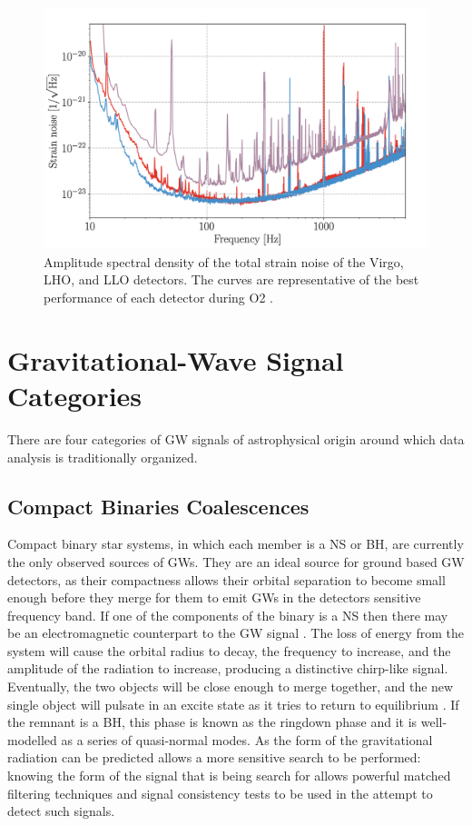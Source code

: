 \documentclass[binding=0.6cm, LaM]{sapthesis}
\begin{document}
        \begin{figure}[t]
          \includegraphics[scale=0.6]{noise1}
          \centering
          \caption{Amplitude spectral density of the total strain noise  of the Virgo, LHO, and LLO detectors. The curves are representative of the best performance of each detector during O2 \cite{13}.}
          \label{fig:noise1}
        \end{figure}

\section{Gravitational-Wave Signal Categories}
\label{sec:sources}
	There are four categories of GW signals of astrophysical origin around which data analysis is traditionally organized.

\subsection{Compact Binaries Coalescences}
	Compact binary star systems, in which each member is a NS or BH, 
	are currently the only observed sources of GWs.
	They are an ideal source for ground based GW detectors, 
	as their compactness allows their orbital separation to become 
	small enough before they merge for them to emit GWs in the detectors sensitive frequency band.
	If one of the components of the binary is a NS 
	then there may be an electromagnetic counterpart to the GW signal \cite{20}. 
	The loss of energy from the system will cause the orbital radius to decay, 
	the frequency to increase, and the amplitude of the radiation to increase, 
	producing a distinctive chirp-like signal. 
	Eventually, the two objects will be close enough to merge together, 
	and the new single object will pulsate in an excite state as it tries to return to equilibrium \cite{21}. 
	If the remnant is a BH, this phase is known as the ringdown phase and it is well-modelled as a series of quasi-normal modes. 
	As the form of the gravitational radiation can be predicted allows 
	a more sensitive search to be performed: knowing the form of the signal 
	that is being search for allows powerful matched filtering techniques 
	and signal consistency tests to be used in the attempt to detect such signals.
\end{document}
